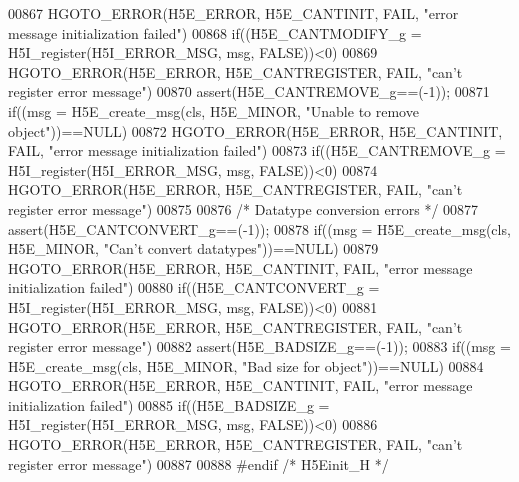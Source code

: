 \begin{DoxyCode}
00867     HGOTO\_ERROR(H5E\_ERROR, H5E\_CANTINIT, FAIL, "error message initialization failed")
00868 if((H5E\_CANTMODIFY\_g = H5I\_register(H5I\_ERROR\_MSG, msg, FALSE))<0)
00869     HGOTO\_ERROR(H5E\_ERROR, H5E\_CANTREGISTER, FAIL, "can't register error message")
00870 assert(H5E\_CANTREMOVE\_g==(-1));
00871 if((msg = H5E\_create\_msg(cls, H5E\_MINOR, "Unable to remove \textcolor{keywordtype}{object}"))==NULL)
00872     HGOTO\_ERROR(H5E\_ERROR, H5E\_CANTINIT, FAIL, "error message initialization failed")
00873 if((H5E\_CANTREMOVE\_g = H5I\_register(H5I\_ERROR\_MSG, msg, FALSE))<0)
00874     HGOTO\_ERROR(H5E\_ERROR, H5E\_CANTREGISTER, FAIL, "can't register error message")
00875 
00876 \textcolor{comment}{/* Datatype conversion errors */}
00877 assert(H5E\_CANTCONVERT\_g==(-1));
00878 if((msg = H5E\_create\_msg(cls, H5E\_MINOR, "Can't convert datatypes"))==NULL)
00879     HGOTO\_ERROR(H5E\_ERROR, H5E\_CANTINIT, FAIL, "error message initialization failed")
00880 if((H5E\_CANTCONVERT\_g = H5I\_register(H5I\_ERROR\_MSG, msg, FALSE))<0)
00881     HGOTO\_ERROR(H5E\_ERROR, H5E\_CANTREGISTER, FAIL, "can't register error message")
00882 assert(H5E\_BADSIZE\_g==(-1));
00883 if((msg = H5E\_create\_msg(cls, H5E\_MINOR, "Bad size for \textcolor{keywordtype}{object}"))==NULL)
00884     HGOTO\_ERROR(H5E\_ERROR, H5E\_CANTINIT, FAIL, "error message initialization failed")
00885 if((H5E\_BADSIZE\_g = H5I\_register(H5I\_ERROR\_MSG, msg, FALSE))<0)
00886     HGOTO\_ERROR(H5E\_ERROR, H5E\_CANTREGISTER, FAIL, "can't register error message")
00887 
00888 \textcolor{preprocessor}{#endif }\textcolor{comment}{/* H5Einit\_H */}\textcolor{preprocessor}{}
\end{DoxyCode}
